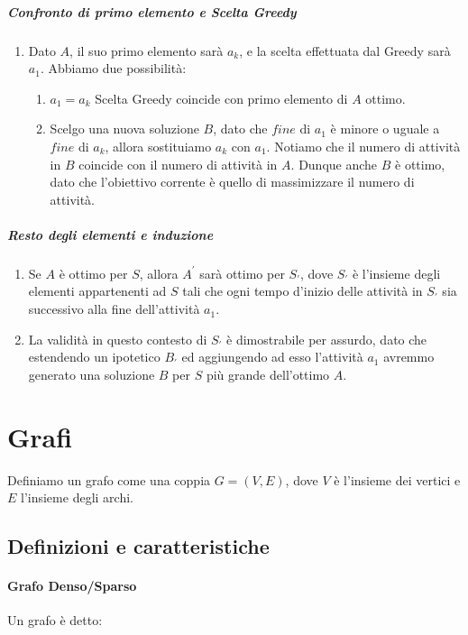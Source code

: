 \documentclass{article}
\begin{document}
\subparagraph{Confronto di primo elemento e Scelta Greedy}

\begin{enumerate}
    \item Dato $A$, il suo primo elemento sarà $a_k$, e la scelta effettuata dal Greedy sarà $a_{1}$. Abbiamo due possibilità:
    \begin{enumerate}
        \item $a_{1} = a_{k}$ Scelta Greedy coincide con primo elemento di $A$ ottimo.
        \item Scelgo una nuova soluzione $B$, dato che $fine$ di $a_{1}$ è minore o uguale a $fine$ di $a_{k}$, allora sostituiamo $a_{k}$ con $a_{1}$. Notiamo che il numero di attività in $B$ coincide con il numero di attività in $A$. Dunque anche $B$ è ottimo, dato che l'obiettivo corrente è quello di massimizzare il numero di attività.
    \end{enumerate}
\end{enumerate}

\subparagraph{Resto degli elementi e induzione}

\begin{enumerate}
    \item Se $A$ è ottimo per $S$, allora $A^{'}$ sarà ottimo per $S_{'}$, dove $S_{'}$ è l'insieme degli elementi appartenenti ad $S$ tali che ogni tempo d'inizio delle attività in $S_{'}$ sia successivo alla fine dell'attività $a_{1}$.
    \item La validità in questo contesto di $S_{'}$ è dimostrabile per assurdo, dato che estendendo un ipotetico $B_{'}$ ed aggiungendo ad esso l'attività $a_{1}$ avremmo generato una soluzione $B$ per $S$ più grande dell'ottimo $A$.
\end{enumerate}

\newpage

\section{Grafi} Definiamo un grafo come una coppia $G = (V,E)$, dove $V$ è l'insieme dei vertici e $E$ l'insieme degli archi.

\subsection{Definizioni e caratteristiche}

\paragraph{Grafo Denso/Sparso} Un grafo è detto:
\end{document}
